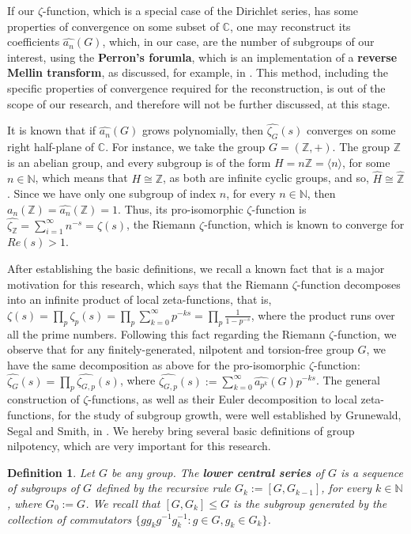 \documentclass[12pt]{article}
\newtheorem{definition}[theorem]{Definition}
\begin{document}
If our $\zeta$-function, which is a special case of the Dirichlet series, has some properties of convergence on some subset of $\mathbb{C}$, one may reconstruct its coefficients $\hat{a_n}(G)$, which, in our case, are the number of subgroups of our interest, using the \textbf{Perron's forumla}, which is an implementation of a \textbf{reverse Mellin transform}, as discussed, for example, in \cite{MontgomeryVaughan}. This method, including the specific properties of convergence required for the reconstruction, is out of the scope of our research, and therefore will not be further discussed, at this stage.\par
It is known that if $\hat{a_n}(G)$ grows polynomially, then $\hat{\zeta_G}(s)$ converges on some right half-plane of $\mathbb{C}$. For instance, we take the group $G=(\mathbb{Z},+)$. The group $\mathbb{Z}$ is an abelian group, and every subgroup is of the form $H=n\mathbb{Z}=\langle n\rangle$, for some $n\in\mathbb{N}$, which means that $H\cong \mathbb{Z}$, as both are infinite cyclic groups, and so, $\widehat{H}\cong\widehat{\mathbb{Z}}$. Since we have only one subgroup of index $n$, for every $n\in\mathbb{N}$, then $a_n(\mathbb{Z})=\hat{a_n}(\mathbb{Z})=1$. Thus, its pro-isomorphic $\zeta$-function is $\hat{\zeta_{\mathbb{Z}}}=\sum_{i=1}^{\infty}n^{-s}=\zeta(s)$, the Riemann $\zeta$-function, which is known to converge for $Re(s)>1$.\par
After establishing the basic definitions, we recall a known fact that is a major motivation for this research, which says that the Riemann $\zeta$-function decomposes into an infinite product of local zeta-functions, that is, $\zeta(s)=\prod_p\zeta_p(s)=\prod_p\sum_{k=0}^\infty p^{-ks}=\prod_p\frac{1}{1-p^{-s}}$, where the product runs over all the prime numbers. Following this fact regarding the Riemann $\zeta$-function, we observe that for any finitely-generated, nilpotent and torsion-free group $G$, we have the same decomposition as above for the pro-isomorphic $\zeta$-function: $\hat{\zeta_G}(s)=\prod_p\hat{\zeta_{G,p}}(s)$, where $\hat{\zeta_{G,p}}(s):=\sum_{k=0}^\infty \hat{a_{p^k}}(G)p^{-ks}$. The general construction of $\zeta$-functions, as well as their Euler decomposition to local zeta-functions, for the study of subgroup growth, were well established by Grunewald, Segal and Smith, in \cite{GrunewaldSegalSmith}. We hereby bring several basic definitions of group nilpotency, which are very important for this research.
\begin{definition}
\label{def.lower.central.series}
Let $G$ be any group. The \textbf{lower central series} of $G$ is a sequence of subgroups of $G$ defined by the recursive rule $G_k:=[G,G_{k-1}]$, for every $k\in\mathbb{N}$, where $G_0:=G$.  We recall that $[G,G_k]\leq G$ is the subgroup generated by the collection of commutators $\{gg_kg^{-1}g_k^{-1} : g\in G,g_k\in G_k\}$.
\end{definition}
\end{document}
